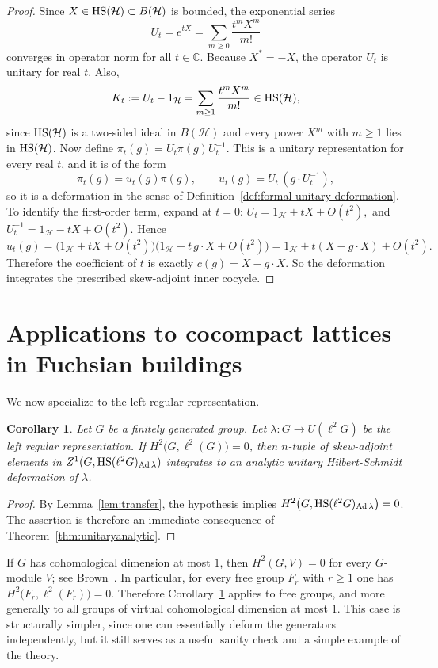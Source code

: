 \documentclass[12pt]{amsproc}
\theoremstyle{plain}
\newtheorem{corollary}[theorem]{Corollary}
\theoremstyle{definition}
\numberwithin{equation}{section}
\newcommand{\HS}{{\rm HS}}
\newcommand{\La}{\lambda}
\DeclareMathOperator{\Ad}{Ad}
\begin{document}
\begin{proof}
Since $X\in \HS(\mathcal H)\subset B(\mathcal H)$ is bounded, the exponential series
\[
U_t=e^{tX}=\sum_{m\ge 0}\frac{t^mX^m}{m!}
\]
converges in operator norm for all $t\in\mathbb C$. Because $X^*=-X$, the
operator $U_t$ is unitary for real $t$. Also,
\[
K_t:=U_t-1_{\mathcal H}=\sum_{m\ge 1}\frac{t^mX^m}{m!}\in \HS(\mathcal H),
\]
since $\HS(\mathcal H)$ is a two-sided ideal in $B(\mathcal H)$ and every power $X^m$ with
$m\ge 1$ lies in $\HS(\mathcal H)$.
Now define
$
\pi_t(g)=U_t\pi(g)U_t^{-1}.
$
This is a unitary representation for every real $t$, and it is of the form
\[
\pi_t(g)=u_t(g)\pi(g),
\qquad
u_t(g)=U_t\,(g\cdot U_t^{-1}),
\]
so it is a deformation in the sense of Definition~\ref{def:formal-unitary-deformation}.
To identify the first-order term, expand at $t=0$:
$
U_t=1_{\mathcal H}+tX+O(t^2),
$ and $
U_t^{-1}=1_{\mathcal H}-tX+O(t^2).
$
Hence
\[
u_t(g)
=\bigl(1_{\mathcal H}+tX+O(t^2)\bigr)\bigl(1_{\mathcal H}-t\,g\cdot X+O(t^2)\bigr)
=1_{\mathcal H}+t(X-g\cdot X)+O(t^2).
\]
Therefore the coefficient of $t$ is exactly
$
c(g)=X-g\cdot X.
$
So the deformation integrates the prescribed skew-adjoint inner cocycle.
\end{proof}


\section{Applications to cocompact lattices in Fuchsian buildings}
\label{sec:applications}

We now specialize to the left regular representation.

\begin{corollary}\label{cor:regular} Let $G$ be a finitely generated group.
Let $\La\colon G\to U(\ell^2 G)$ be the left regular representation. If $H^2\bigl(G,\ell^2(G)\bigr)=0$, then $n$-tuple of skew-adjoint elements in
$
Z^1(G,\HS(\ell^2 G)_{\Ad\La})
$
integrates to an analytic unitary Hilbert-Schmidt deformation of $\La$.
\end{corollary}

\begin{proof}
By Lemma~\ref{lem:transfer}, the hypothesis implies $H^2\bigl(G,\HS(\ell^2 G)_{\Ad\La}\bigr)=0$. The assertion is therefore an immediate consequence of Theorem~\ref{thm:unitaryanalytic}.
\end{proof}

If $G$ has cohomological dimension at most $1$, then $H^2(G,V)=0$ for every $G$-module $V$; see Brown~\cite[Chap.~VIII]{Brown1982}. In particular, for every free group $F_r$ with $r\ge 1$ one has
$
H^2\bigl(F_r,\ell^2(F_r)\bigr)=0.
$
Therefore Corollary~\ref{cor:regular} applies to free groups, and more generally to all groups of virtual cohomological dimension at most $1$. This case is structurally simpler, since one can essentially deform the generators independently, but it still serves as a useful sanity check and a simple example of the theory.
\end{document}
